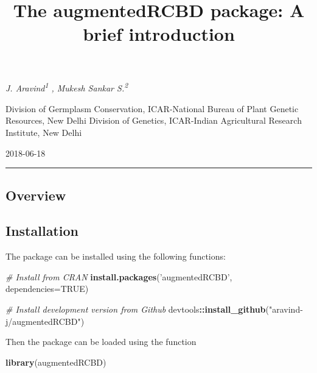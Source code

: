 \documentclass[]{article}
\title{The \textbf{augmentedRCBD} package: A brief introduction}
\author{}
\date{}
\newenvironment{Shaded}{\begin{snugshade}}{\end{snugshade}}
\newcommand{\CommentTok}[1]{\textcolor[rgb]{0.56,0.35,0.01}{\textit{#1}}}
\newcommand{\DataTypeTok}[1]{\textcolor[rgb]{0.13,0.29,0.53}{#1}}
\newcommand{\KeywordTok}[1]{\textcolor[rgb]{0.13,0.29,0.53}{\textbf{#1}}}
\newcommand{\NormalTok}[1]{#1}
\newcommand{\OperatorTok}[1]{\textcolor[rgb]{0.81,0.36,0.00}{\textbf{#1}}}
\newcommand{\OtherTok}[1]{\textcolor[rgb]{0.56,0.35,0.01}{#1}}
\newcommand{\StringTok}[1]{\textcolor[rgb]{0.31,0.60,0.02}{#1}}
\begin{document}
\maketitle

\begin{center}
 {\it J. Aravind\textsuperscript{1} , Mukesh Sankar S.\textsuperscript{2}}
\end{center}

\begin{center}
 Division of Germplasm Conservation, ICAR-National Bureau of Plant Genetic Resources, New Delhi
 Division of Genetics, ICAR-Indian Agricultural Research Institute, New Delhi
\end{center}

\begin{center}
2018-06-18
\end{center}

\begin{center}
\vspace{6pt}
\hrule
\end{center}

\tableofcontents

\hypertarget{overview}{%
\subsection{Overview}\label{overview}}

\hypertarget{installation}{%
\subsection{Installation}\label{installation}}

The package can be installed using the following functions:

\begin{Shaded}
\begin{Highlighting}[]
\CommentTok{# Install from CRAN}
\KeywordTok{install.packages}\NormalTok{(}\StringTok{'augmentedRCBD'}\NormalTok{, }\DataTypeTok{dependencies=}\OtherTok{TRUE}\NormalTok{)}

\CommentTok{# Install development version from Github}
\NormalTok{devtools}\OperatorTok{::}\KeywordTok{install_github}\NormalTok{(}\StringTok{"aravind-j/augmentedRCBD"}\NormalTok{)}
\end{Highlighting}
\end{Shaded}

Then the package can be loaded using the function

\begin{Shaded}
\begin{Highlighting}[]
\KeywordTok{library}\NormalTok{(augmentedRCBD)}
\end{Highlighting}
\end{Shaded}
\end{document}
